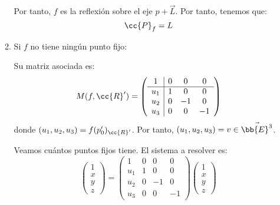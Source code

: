 \begin{enumerate}
\begin{enumerate}
        Por tanto, $f$ es la reflexión sobre el eje $p+\vec{L}$. Por tanto, tenemos que:
        \begin{equation*}
            \cc{P}_f = L
        \end{equation*}

        \item Si $f$ no tiene ningún punto fijo:

        Su matriz asociada es:
        \begin{equation*}
            M(f,\cc{R}') = \left(\begin{array}{c|ccc}
                1 & 0 & 0 & 0 \\ \hline
                u_1 & 1 & 0 & 0\\ 
                u_2 & 0 & -1 & 0 \\
                u_3 & 0 & 0 & -1
            \end{array}\right)
        \end{equation*}
        donde $(u_1,u_2,u_3)=f(p_0')_{\cc{R}'}$. Por tanto, $(u_1, u_2, u_3)=v\in \vec{\bb{E}^3}$.
    
        Veamos cuántos puntos fijos tiene. El sistema a resolver es:
        \begin{equation*}
            \left(\begin{array}{c}
                1 \\ \hline x \\ y \\ z
            \end{array}\right)
            = \left(\begin{array}{c|ccc}
                1 & 0 & 0 & 0 \\ \hline
                u_1 & 1 & 0 & 0\\ 
                u_2 & 0 & -1 & 0 \\
                u_3 & 0 & 0 & -1
            \end{array}\right)
            \left(\begin{array}{c}
                1 \\ \hline x \\ y \\ z
            \end{array}\right)
        \end{equation*}


\end{enumerate}
\end{enumerate}
